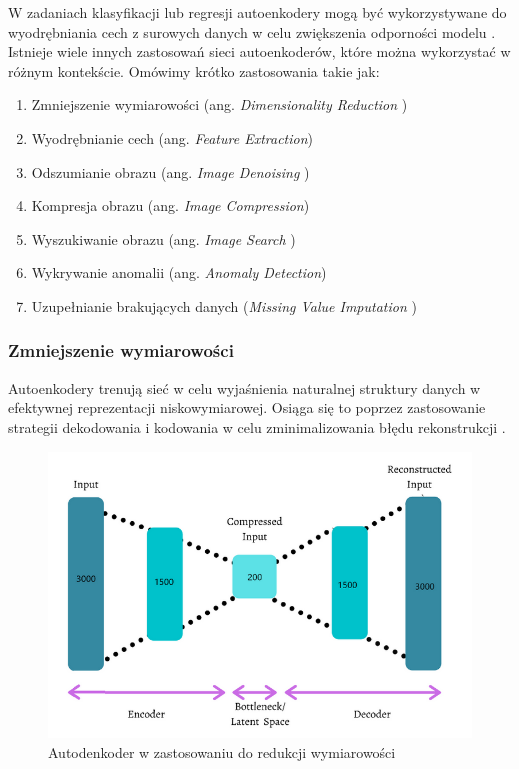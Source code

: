 \documentclass[12pt]{mwbk}
\theoremstyle{plain}
\theoremstyle{definition}
\theoremstyle{remark}
\newcommand\zrodlo[1]{\par\vspace{-3mm}{\small\textit{Źródło: }#1 }}
\begin{document}
W zadaniach klasyfikacji lub regresji autoenkodery mogą być wykorzystywane do wyodrębniania cech z surowych danych w celu zwiększenia odporności modelu \cite{kumar}. Istnieje wiele innych zastosowań sieci autoenkoderów, które można wykorzystać w różnym kontekście. Omówimy krótko zastosowania takie jak:
\begin{enumerate}
\item  Zmniejszenie wymiarowości (ang. \emph{Dimensionality Reduction })

\item  Wyodrębnianie cech (ang. \emph{Feature Extraction})

\item  Odszumianie obrazu (ang. \emph{Image Denoising })

\item  Kompresja obrazu (ang. \emph{Image Compression})

\item Wyszukiwanie obrazu (ang. \emph{ Image Search })

\item Wykrywanie anomalii (ang. \emph{ Anomaly Detection})

\item  Uzupełnianie brakujących danych (\emph{Missing Value Imputation })

\end{enumerate}

\subsubsection{Zmniejszenie wymiarowości}


Autoenkodery trenują sieć w celu wyjaśnienia naturalnej struktury danych w efektywnej reprezentacji niskowymiarowej. Osiąga się to poprzez zastosowanie strategii dekodowania i kodowania w celu zminimalizowania błędu rekonstrukcji \cite{kumar}.

\newpage

\begin{figure}[!h]
	\centering
	\includegraphics[width=0.8\linewidth]{rys/dimensionality_reduction.png}
	\caption{Autodenkoder w zastosowaniu do redukcji wymiarowości}
	\zrodlo{\cite{kumar}}
	\label{fig:dimensionality-reduction}
\end{figure}
\end{document}

